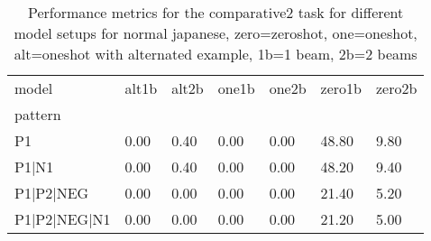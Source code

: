 \begin{table}[h]
\begin{tabular}{l|llllll}
\toprule
model & alt1b & alt2b & one1b & one2b & zero1b & zero2b \\
pattern &  &  &  &  &  &  \\
\midrule
P1 & 0.00 & 0.40 & 0.00 & 0.00 & 48.80 & 9.80 \\
P1|N1 & 0.00 & 0.40 & 0.00 & 0.00 & 48.20 & 9.40 \\
P1|P2|NEG & 0.00 & 0.00 & 0.00 & 0.00 & 21.40 & 5.20 \\
P1|P2|NEG|N1 & 0.00 & 0.00 & 0.00 & 0.00 & 21.20 & 5.00 \\
\bottomrule
\end{tabular}
\caption{Performance metrics for the comparative2 task for different model setups for normal japanese, zero=zeroshot, one=oneshot, alt=oneshot with alternated example, 1b=1 beam, 2b=2 beams}
\label{tab:ja norm_comparative2_performance}
\end{table}
